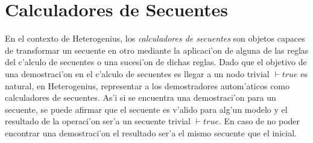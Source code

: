 \section{Calculadores de Secuentes}

En el contexto de Heterogenius, los \textit{calculadores de secuentes} son objetos capaces de transformar un secuente en otro mediante la aplicaci'on de alguna de las reglas del c'alculo de secuentes o una sucesi'on de dichas reglas.
Dado que el objetivo de una demostraci'on en el c'alculo de secuentes es llegar a un nodo trivial $\vdash true$ es natural, en Heterogenius, representar a los demostradores autom'aticos como calculadores de secuentes. As'i si se encuentra una demostraci'on para un secuente, se puede afirmar que el secuente es v'alido para alg'un modelo y el resultado de la operaci'on ser'a un secuente trivial $\vdash true$. En caso de no poder encontrar una demostraci'on el resultado ser'a el mismo secuente que el inicial.